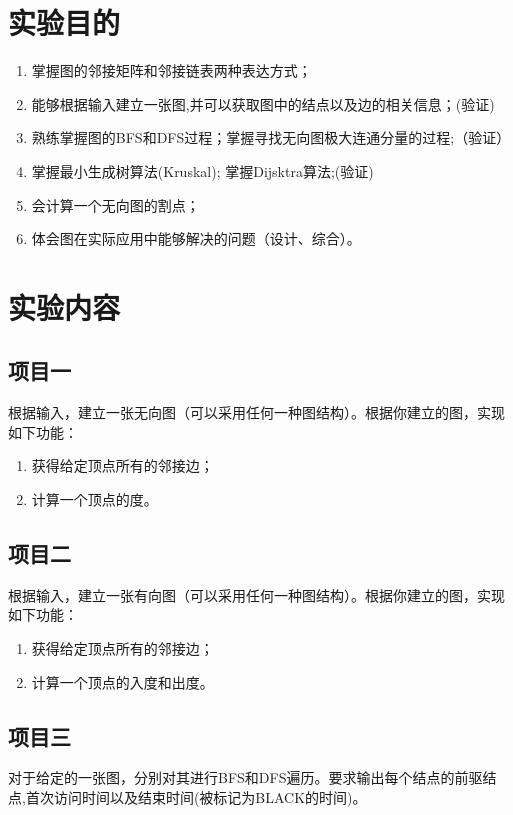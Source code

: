 \newpage
\xiaosihao
\section{实验目的}
\begin{enumerate}
\item 掌握图的邻接矩阵和邻接链表两种表达方式；
\item 能够根据输入建立一张图,并可以获取图中的结点以及边的相关信息；(验证)
\item 熟练掌握图的BFS和DFS过程；掌握寻找无向图极大连通分量的过程;（验证）
\item 掌握最小生成树算法(Kruskal); 掌握Dijsktra算法;(验证)
\item 会计算一个无向图的割点；
\item 体会图在实际应用中能够解决的问题（设计、综合）。
\end{enumerate}

\section{实验内容}
\subsection{项目一}
根据输入，建立一张无向图（可以采用任何一种图结构）。根据你建立的图，实现如下功能：
\begin{enumerate}
\item 获得给定顶点所有的邻接边；
\item 计算一个顶点的度。

\end{enumerate}

\subsection{项目二}
根据输入，建立一张有向图（可以采用任何一种图结构）。根据你建立的图，实现如下功能：
\begin{enumerate}
\item 获得给定顶点所有的邻接边；
\item 计算一个顶点的入度和出度。
\end{enumerate}

\subsection{项目三}
对于给定的一张图，分别对其进行BFS和DFS遍历。要求输出每个结点的前驱结点,首次访问时间以及结束时间(被标记为BLACK的时间)。

